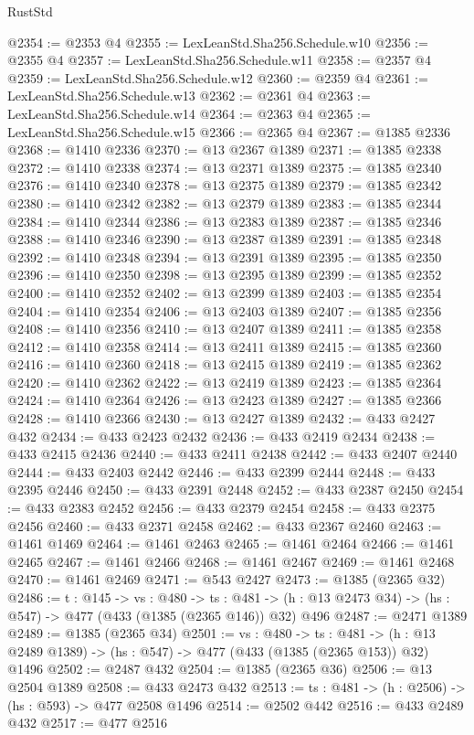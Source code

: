 \begin{lexlean}{RustStd}
\begin{coremodule}
{\begin{coremodule}
{{{{{{{@2354 := @2353 @4
@2355 := LexLeanStd.Sha256.Schedule.w10
@2356 := @2355 @4
@2357 := LexLeanStd.Sha256.Schedule.w11
@2358 := @2357 @4
@2359 := LexLeanStd.Sha256.Schedule.w12
@2360 := @2359 @4
@2361 := LexLeanStd.Sha256.Schedule.w13
@2362 := @2361 @4
@2363 := LexLeanStd.Sha256.Schedule.w14
@2364 := @2363 @4
@2365 := LexLeanStd.Sha256.Schedule.w15
@2366 := @2365 @4
@2367 := @1385 @2336
@2368 := @1410 @2336
@2370 := @13 @2367 @1389
@2371 := @1385 @2338
@2372 := @1410 @2338
@2374 := @13 @2371 @1389
@2375 := @1385 @2340
@2376 := @1410 @2340
@2378 := @13 @2375 @1389
@2379 := @1385 @2342
@2380 := @1410 @2342
@2382 := @13 @2379 @1389
@2383 := @1385 @2344
@2384 := @1410 @2344
@2386 := @13 @2383 @1389
@2387 := @1385 @2346
@2388 := @1410 @2346
@2390 := @13 @2387 @1389
@2391 := @1385 @2348
@2392 := @1410 @2348
@2394 := @13 @2391 @1389
@2395 := @1385 @2350
@2396 := @1410 @2350
@2398 := @13 @2395 @1389
@2399 := @1385 @2352
@2400 := @1410 @2352
@2402 := @13 @2399 @1389
@2403 := @1385 @2354
@2404 := @1410 @2354
@2406 := @13 @2403 @1389
@2407 := @1385 @2356
@2408 := @1410 @2356
@2410 := @13 @2407 @1389
@2411 := @1385 @2358
@2412 := @1410 @2358
@2414 := @13 @2411 @1389
@2415 := @1385 @2360
@2416 := @1410 @2360
@2418 := @13 @2415 @1389
@2419 := @1385 @2362
@2420 := @1410 @2362
@2422 := @13 @2419 @1389
@2423 := @1385 @2364
@2424 := @1410 @2364
@2426 := @13 @2423 @1389
@2427 := @1385 @2366
@2428 := @1410 @2366
@2430 := @13 @2427 @1389
@2432 := @433 @2427 @432
@2434 := @433 @2423 @2432
@2436 := @433 @2419 @2434
@2438 := @433 @2415 @2436
@2440 := @433 @2411 @2438
@2442 := @433 @2407 @2440
@2444 := @433 @2403 @2442
@2446 := @433 @2399 @2444
@2448 := @433 @2395 @2446
@2450 := @433 @2391 @2448
@2452 := @433 @2387 @2450
@2454 := @433 @2383 @2452
@2456 := @433 @2379 @2454
@2458 := @433 @2375 @2456
@2460 := @433 @2371 @2458
@2462 := @433 @2367 @2460
@2463 := @1461 @1469
@2464 := @1461 @2463
@2465 := @1461 @2464
@2466 := @1461 @2465
@2467 := @1461 @2466
@2468 := @1461 @2467
@2469 := @1461 @2468
@2470 := @1461 @2469
@2471 := @543 @2427
@2473 := @1385 (@2365 @32)
@2486 := {t : @145} ->
  {vs : @480} ->
  {ts : @481} -> (h : @13 @2473 @34) -> (hs : @547) -> @477 (@433 (@1385 (@2365 @146)) @32) @496
@2487 := @2471 @1389
@2489 := @1385 (@2365 @34)
@2501 := {vs : @480} ->
  {ts : @481} -> (h : @13 @2489 @1389) -> (hs : @547) -> @477 (@433 (@1385 (@2365 @153)) @32) @1496
@2502 := @2487 @432
@2504 := @1385 (@2365 @36)
@2506 := @13 @2504 @1389
@2508 := @433 @2473 @432
@2513 := {ts : @481} -> (h : @2506) -> (hs : @593) -> @477 @2508 @1496
@2514 := @2502 @442
@2516 := @433 @2489 @432
@2517 := @477 @2516
}}}}}}}
\end{coremodule}}
\end{coremodule}
\end{lexlean}
